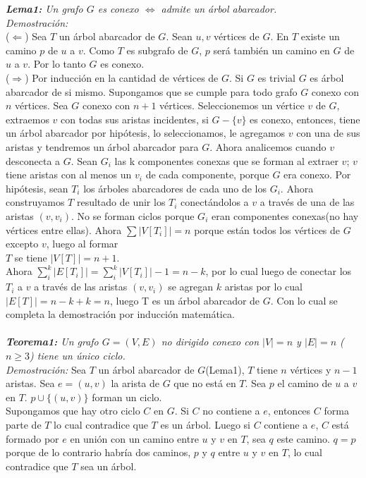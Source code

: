 \documentclass[12pt]{article}
\begin{document}
\textit{\textbf{Lema1:}
Un grafo $G$ es conexo $\Leftrightarrow$ admite un \'arbol abarcador.}\\
\textit{Demostraci\'on:}\\
($\Leftarrow$) Sea $T$ un \'arbol abarcador de $G$. Sean $u,v$ v\'ertices de $G$. En $T$ existe un camino $p$ de $u$ a $v$. Como $T$ es subgrafo de $G$, $p$ ser\'a tambi\'en un camino en $G$ de $u$ a $v$. Por lo tanto $G$ es conexo.\\
($\Rightarrow$)  Por inducci\'on en la cantidad de v\'ertices de $G$. Si $G$ es trivial $G$ es \'arbol abarcador de si mismo. Supongamos que 
se cumple para todo grafo $G$ conexo con $n$ v\'ertices. Sea $G$ conexo con $n+1$ v\'ertices. Seleccionemos un v\'ertice $v$ de $G$, extraemos $v$ con todas sus aristas incidentes, si $G-\{v\}$ es conexo, entonces, tiene un \'arbol abarcador por hip\'otesis, lo seleccionamos, le agregamos $v$ con una de sus aristas y tendremos un \'arbol abarcador para $G$. Ahora analicemos cuando $v$ desconecta a $G$. Sean $G_i$ las k componentes conexas que se forman al extraer $v$; $v$ tiene aristas con al menos un $v_i$ de cada componente, porque $G$ era conexo. Por hip\'otesis, sean $T_i$ los \'arboles abarcadores de cada uno de los $G_i$. Ahora construyamos $T$ resultado de unir los $T_i$ conect\'andolos a $v$ a trav\'es de una de las aristas $(v,v_i)$. No se forman ciclos porque $G_i$ eran componentes conexas(no hay v\'ertices entre ellas). Ahora $\sum |V[T_i]| = n$ porque est\'an todos los v\'ertices de $G$ excepto $v$, luego al formar \\
$T$ se tiene $|V[T]|=n+1$.\\ 
Ahora $\sum\limits_{i}^{k} |E[T_i]| = \sum\limits_{i}^{k} |V[T_i]|-1 = n-k$, por lo cual luego de conectar los $T_i$ a $v$ a trav\'es de 
las aristas $(v,v_i)$ se agregan $k$ aristas por lo cual $|E[T]| = n-k+k=n$, luego T es un \'arbol abarcador de $G$. Con lo cual se completa la demostraci\'on por inducci\'on matem\'atica.\\
\\   


\textit{\textbf{Teorema1:} Un grafo $G=(V,E)$ no dirigido conexo con $|V|=n$ y $|E| = n$ ($n\geq 3$) tiene un \'unico ciclo.}\\
\textit{Demostraci\'on:} Sea $T$ un \'arbol abarcador de $G$(Lema1), $T$ tiene $n$ v\'ertices y $n-1$ aristas. Sea $e = (u,v)$ la arista de $G$ que no est\'a en $T$. Sea $p$ el camino de $u$ a $v$ en $T$. $p\cup \{(u,v)\}$ forman un ciclo.\\
Supongamos que hay otro ciclo $C$ en $G$. Si $C$ no contiene a $e$, entonces $C$ forma parte de 
$T$ lo cual contradice que $T$ es un \'arbol. Luego si $C$ contiene a $e$, $C$ est\'a formado por $e$ en uni\'on con un camino entre $u$ y $v$ en $T$, sea $q$ este camino. $q=p$ porque de lo contrario habr\'ia dos caminos, $p$ y $q$ entre $u$ y $v$ en $T$, lo cual contradice que $T$ sea un \'arbol.\\
\\
\end{document}
